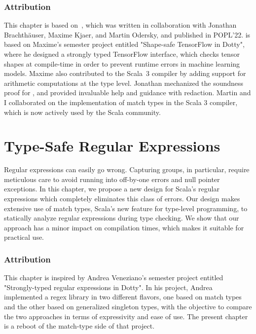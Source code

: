 \subsection*{Attribution}

This chapter is based on~\citep{blanvillain2022type}, which was written in collaboration with Jonathan Brachthäuser, Maxime Kjaer, and Martin Odersky, and published in POPL'22.
 is based on Maxime's semester project entitled "Shape-safe TensorFlow in Dotty", where he designed a strongly typed TensorFlow interface, which checks tensor shapes at compile-time in order to prevent runtime errors in machine learning models.
Maxime also contributed to the Scala~3 compiler by adding support for arithmetic computations at the type level.
Jonathan mechanized the soundness proof for \SystemFm, and provided invaluable help and guidance with redaction.
Martin and I collaborated on the implementation of match types in the Scala 3 compiler, which is now actively used by the Scala community.



\chapter{Type-Safe Regular Expressions}
\label{chap:type-safe-regular-expressions}

Regular expressions can easily go wrong.
Capturing groups, in particular, require meticulous care to avoid running into off-by-one errors and null pointer exceptions.
In this chapter, we propose a new design for Scala's regular expressions which completely eliminates this class of errors.
Our design makes extensive use of match types, Scala's new feature for type-level programming, to statically analyze regular expressions during type checking.
We show that our approach has a minor impact on compilation times, which makes it suitable for practical use.

\subsection*{Attribution}

This chapter is inspired by Andrea Veneziano's semester project entitled "Strongly-typed regular expressions in Dotty".
In his project, Andrea implemented a regex library in two different flavors, one based on match types and the other based on generalized singleton types, with the objective to compare the two approaches in terms of expressivity and ease of use.
The present chapter is a reboot of the match-type side of that project.

